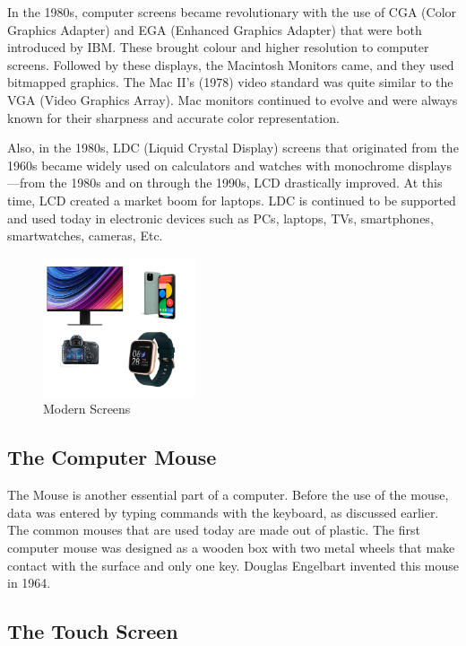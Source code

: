\documentclass{article}
\begin{document}
In the 1980s, computer screens became revolutionary with the use of CGA (Color Graphics Adapter) and EGA (Enhanced Graphics Adapter) that were both introduced by IBM. These brought colour and higher resolution to computer screens. Followed by these displays, the Macintosh Monitors came, and they used bitmapped graphics. The Mac II's (1978) video standard was quite similar to the VGA (Video Graphics Array). Mac monitors continued to evolve and were always known for their sharpness and accurate color representation.

Also, in the 1980s, LDC (Liquid Crystal Display) screens that originated from the 1960s became widely used on calculators and watches with monochrome displays—from the 1980s and on through the 1990s, LCD drastically improved. At this time, LCD created a market boom for laptops. LDC is continued to be supported and used today in electronic devices such as PCs, laptops, TVs, smartphones, smartwatches, cameras, Etc.
\cite{ref5}

\begin{figure}[!h]
    \caption{Modern Screens}
    \label{image:MODERNSCREENS}
    \centering
    \includegraphics[width=0.4\textwidth]{pics/modern_screens.png}
\end{figure}

\subsection{The Computer Mouse}
The Mouse is another essential part of a computer. Before the use of the mouse, data was entered by typing commands with the keyboard, as discussed earlier. The common mouses that are used today are made out of plastic. The first computer mouse was designed as a wooden box with two metal wheels that make contact with the surface and only one key. Douglas Engelbart invented this mouse in 1964.

\newpage
\subsection{The Touch Screen}
\end{document}
